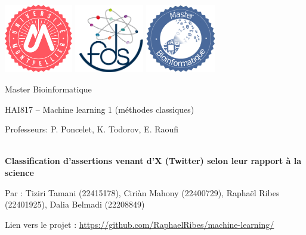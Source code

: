 \documentclass[leqno]{article}[11pt]
\begin{document}
    \onehalfspace

    \begin{titlepage}
        \begin{center}
            \includegraphics[height=3cm]{images/logo_UM}\hspace{0.2\textwidth}
            \includegraphics[height=3cm]{images/logo_fds_rond}\hspace{0.2\textwidth}
            \includegraphics[height=3cm]{images/Logo_Bioinfo}

            {\Huge Master Bioinformatique\\[1cm]}

            {\large HAI817 -- Machine learning 1 (méthodes classiques)}\\[0.7cm]

            \begin{center}
                \large{Professeurs: P. Poncelet, K. Todorov, E. Raoufi}
            \end{center}

            \vspace{3.5cm}

            \hrulefill\\[0.4cm]
            {\fontsize{18}{22}\textbf{Classification d'assertions venant d’X (Twitter) selon leur rapport à la science}}\\[0.4cm]
            \hrulefill

            \vspace{1cm}
            {\large Par : Tiziri Tamani (22415178), Ciriàn Mahony (22400729), Raphaël Ribes (22401925), Dalia Belmadi (22208849)}

            \vspace{1cm}
            Lien vers le projet : \url{https://github.com/RaphaelRibes/machine-learning/}
        \end{center}
    \end{titlepage}
\end{document}
